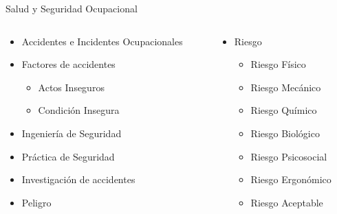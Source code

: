 \documentclass[spanish, aspectratio=169]{beamer}
\begin{document}
\begin{frame}[allowframebreaks]{Salud y Seguridad Ocupacional}
  \begin{columns}[T]
    \begin{column}{0.5\textwidth}
      \begin{itemize}
        \item Accidentes e Incidentes Ocupacionales
        \item Factores de accidentes
        \begin{itemize}
            \item Actos Inseguros
            \item Condición Insegura
        \end{itemize}
        \item Ingeniería de Seguridad
        \item Práctica de Seguridad
        \item Investigación de accidentes
        \item Peligro
      \end{itemize}
      \end{column}
      \begin{column}{0.5\textwidth}
        \begin{itemize}
        \item Riesgo
        \begin{itemize}
            \item Riesgo Físico
            \item Riesgo Mecánico
            \item Riesgo Químico
            \item Riesgo Biológico
            \item Riesgo Psicosocial
            \item Riesgo Ergonómico
            \item Riesgo Aceptable
        \end{itemize}
      \end{itemize}
    \end{column}
  \end{columns}
\end{frame}
\end{document}
